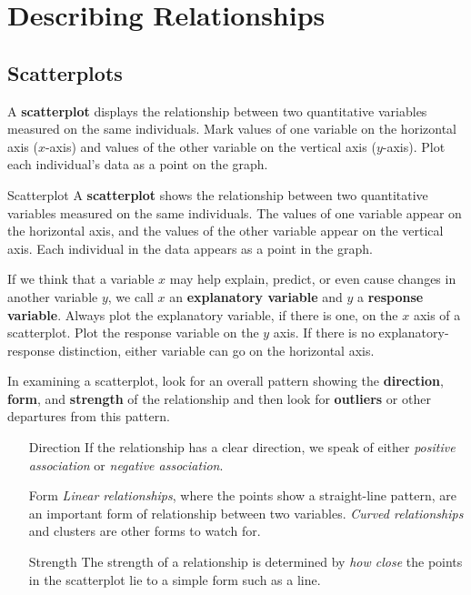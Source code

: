 \section{Describing Relationships}

\subsection{Scatterplots}

A \textbf{scatterplot} displays the relationship between two quantitative variables measured on the same individuals. Mark values of one variable on the horizontal axis ($x$-axis) and values of the other variable on the vertical axis ($y$-axis). Plot each individual's data as a point on the graph.

\begin{definition}{Scatterplot}{}
    A \textbf{scatterplot} shows the relationship between two quantitative variables measured on the same individuals. The values of one variable appear on the horizontal axis, and the values of the other variable appear on the vertical axis. Each individual in the data appears as a point in the graph.
\end{definition}

If we think that a variable $x$ may help explain, predict, or even cause changes in another variable $y$, we call $x$ an \textbf{explanatory variable} and $y$ a \textbf{response variable}. Always plot the explanatory variable, if there is one, on the $x$ axis of a scatterplot. Plot the response variable on the $y$ axis. If there is no explanatory-response distinction, either variable can go on the horizontal axis.

In examining a scatterplot, look for an overall pattern showing the \textbf{direction}, \textbf{form}, and \textbf{strength} of the relationship and then look for \textbf{outliers} or other departures from this pattern.

\begin{itemize}[font=\sffamily\bfseries, leftmargin=1.95cm, style=nextline, itemsep=0cm]
\item[Direction] If the relationship has a clear direction, we speak of either \textit{positive association} or \textit{negative association}.
\item[Form] \textit{Linear relationships}, where the points show a straight-line pattern, are an important form of relationship between two variables. \textit{Curved relationships} and clusters are other forms to watch for.
\item[Strength] The strength of a relationship is determined by \textit{how close} the points in the scatterplot lie to a simple form such as a line.
\end{itemize}

